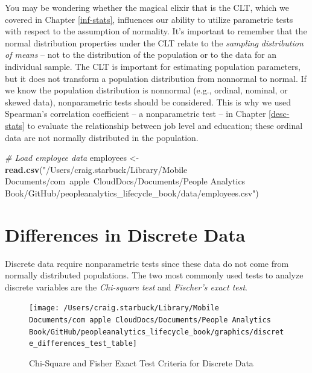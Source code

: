 \documentclass[]{book}
\newenvironment{Shaded}{\begin{snugshade}}{\end{snugshade}}
\newcommand{\CommentTok}[1]{\textcolor[rgb]{0.56,0.35,0.01}{\textit{#1}}}
\newcommand{\KeywordTok}[1]{\textcolor[rgb]{0.13,0.29,0.53}{\textbf{#1}}}
\newcommand{\NormalTok}[1]{#1}
\newcommand{\StringTok}[1]{\textcolor[rgb]{0.31,0.60,0.02}{#1}}
\begin{document}
You may be wondering whether the magical elixir that is the CLT, which we covered in Chapter \ref{inf-stats}, influences our ability to utilize parametric tests with respect to the assumption of normality. It's important to remember that the normal distribution properties under the CLT relate to the \emph{sampling distribution of means} -- not to the distribution of the population or to the data for an individual sample. The CLT is important for estimating population parameters, but it does not transform a population distribution from nonnormal to normal. If we know the population distribution is nonnormal (e.g., ordinal, nominal, or skewed data), nonparametric tests should be considered. This is why we used Spearman's correlation coefficient -- a nonparametric test -- in Chapter \ref{desc-stats} to evaluate the relationship between job level and education; these ordinal data are not normally distributed in the population.

\begin{Shaded}
\begin{Highlighting}[]
\CommentTok{# Load employee data}
\NormalTok{employees <-}\StringTok{ }\KeywordTok{read.csv}\NormalTok{(}\StringTok{"/Users/craig.starbuck/Library/Mobile Documents/com~apple~CloudDocs/Documents/People Analytics Book/GitHub/peopleanalytics_lifecycle_book/data/employees.csv"}\NormalTok{)}
\end{Highlighting}
\end{Shaded}

\hypertarget{differences-in-discrete-data}{%
\section{Differences in Discrete Data}\label{differences-in-discrete-data}}

Discrete data require nonparametric tests since these data do not come from normally distributed populations. The two most commonly used tests to analyze discrete variables are the \emph{Chi-square test} and \emph{Fischer's exact test}.

\begin{figure}

{\centering \texttt{[image: /Users/craig.starbuck/Library/Mobile Documents/com~apple~CloudDocs/Documents/People Analytics Book/GitHub/peopleanalytics\_lifecycle\_book/graphics/discrete\_differences\_test\_table]} 

}

\caption{Chi-Square and Fisher Exact Test Criteria for Discrete Data}\label{fig:discrete-tests}
\end{figure}
\end{document}
